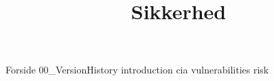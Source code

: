 \documentclass[a4paper,openany]{memoir}
\title{Sikkerhed}
\begin{document}
	{Forside}  \newpage
	\tableofcontents\thispagestyle{fancy}
	{00_VersionHistory}  \newpage
	{introduction}  \newpage
	{cia}  \newpage
	{vulnerabilities}  \newpage
	{risk}  \newpage
	
	 {}
	\printbibliography
\end{document}
